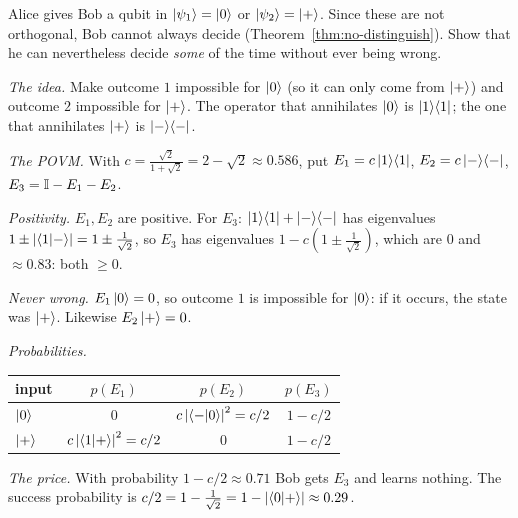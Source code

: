 \begin{example}\label{ex:unambiguous}
  Alice gives Bob a qubit in $\left|\psi_1\right\rangle=\left|0\right\rangle$ or $\left|\psi_2\right\rangle=\left|+\right\rangle$. Since these are not orthogonal, Bob cannot always decide (Theorem~\ref{thm:no-distinguish}). Show that he can nevertheless decide \emph{some} of the time without ever being wrong.
\end{example}
\begin{solution}
  \begin{steps}
    \item \emph{The idea.} Make outcome $1$ impossible for $\left|0\right\rangle$ (so it can only come from $\left|+\right\rangle$) and outcome $2$ impossible for $\left|+\right\rangle$. The operator that annihilates $\left|0\right\rangle$ is $\left|1\right\rangle\!\left\langle1\right|$; the one that annihilates $\left|+\right\rangle$ is $\left|-\right\rangle\!\left\langle-\right|$.
    \item \emph{The POVM.} With $c=\frac{\sqrt2}{1+\sqrt2}=2-\sqrt2\approx0.586$, put $E_1=c\left|1\right\rangle\!\left\langle1\right|$, $E_2=c\left|-\right\rangle\!\left\langle-\right|$, $E_3=\mathbb{I}-E_1-E_2$.
    \item \emph{Positivity.} $E_1,E_2$ are positive. For $E_3$: $\left|1\right\rangle\!\left\langle1\right|+\left|-\right\rangle\!\left\langle-\right|$ has eigenvalues $1\pm\left|\left\langle1\middle|-\right\rangle\right|=1\pm\tfrac1{\sqrt2}$, so $E_3$ has eigenvalues $1-c(1\pm\tfrac1{\sqrt2})$, which are $0$ and $\approx0.83$: both $\ge0$.
    \item \emph{Never wrong.} $E_1\left|0\right\rangle=0$, so outcome $1$ is impossible for $\left|0\right\rangle$: if it occurs, the state was $\left|+\right\rangle$. Likewise $E_2\left|+\right\rangle=0$.
    \item \emph{Probabilities.}
      \begin{center}
      \begin{tabular}{lccc}
        \toprule
        input & $p(E_1)$ & $p(E_2)$ & $p(E_3)$\\
        \midrule
        $\left|0\right\rangle$ & $0$ & $c\left|\left\langle-\middle|0\right\rangle\right|^2=c/2$ & $1-c/2$\\
        $\left|+\right\rangle$ & $c\left|\left\langle1\middle|+\right\rangle\right|^2=c/2$ & $0$ & $1-c/2$\\
        \bottomrule
      \end{tabular}
      \end{center}
    \item \emph{The price.} With probability $1-c/2\approx0.71$ Bob gets $E_3$ and learns nothing. The success probability is $c/2=1-\tfrac1{\sqrt2}=1-\left|\left\langle0\middle|+\right\rangle\right|\approx0.29$.
  \end{steps}
\end{solution}

